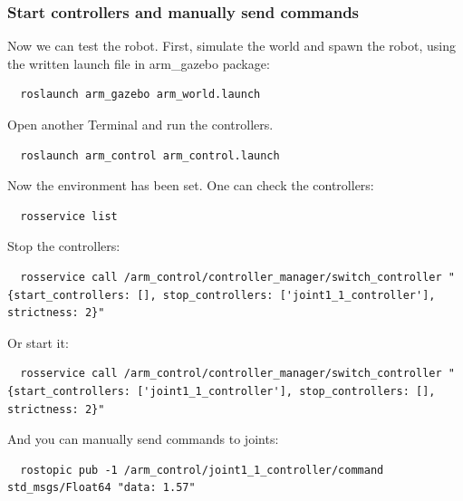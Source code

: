 \documentclass[pdftex,12pt,a4paper]{article}
\begin{document}
  \subsubsection{Start controllers and manually send commands}
  Now we can test the robot. First, simulate the world and spawn the robot, using the written launch file in arm\_gazebo package:
  \begin{lstlisting}
  roslaunch arm_gazebo arm_world.launch
  \end{lstlisting}
  Open another Terminal and run the controllers.
  \begin{lstlisting}
  roslaunch arm_control arm_control.launch
  \end{lstlisting}
  Now the environment has been set. One can check the controllers:
  \begin{lstlisting}
  rosservice list
  \end{lstlisting}
  Stop the controllers:
  \begin{lstlisting}
  rosservice call /arm_control/controller_manager/switch_controller "{start_controllers: [], stop_controllers: ['joint1_1_controller'], strictness: 2}"
  \end{lstlisting}
  Or start it:
  \begin{lstlisting}
  rosservice call /arm_control/controller_manager/switch_controller "{start_controllers: ['joint1_1_controller'], stop_controllers: [], strictness: 2}"
  \end{lstlisting}
  And you can manually send commands to joints:
  \begin{lstlisting}
  rostopic pub -1 /arm_control/joint1_1_controller/command std_msgs/Float64 "data: 1.57"
  \end{lstlisting}
  
  \newpage
\end{document}
